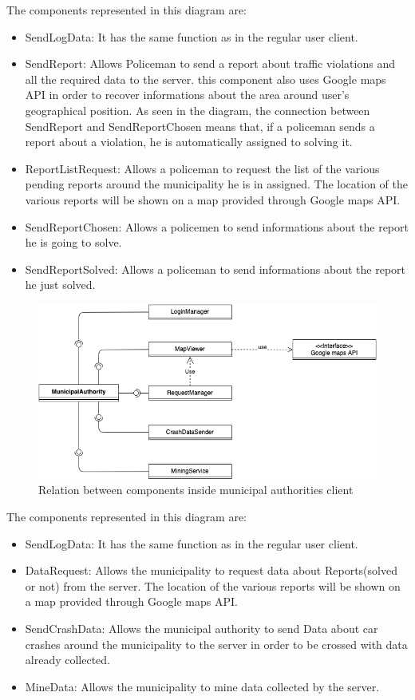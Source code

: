 The components represented in this diagram are:
\begin{itemize}
	\item SendLogData: It has the same function as in the regular user client.
	\item SendReport: Allows Policeman to send a report about traffic violations and all the required data to the server.
	this component also uses Google maps API in order to recover informations about the area around user's geographical position.
	As seen in the diagram, the connection between SendReport and SendReportChosen means that, if a policeman sends a report about a violation, he is automatically assigned to solving it.
	\item ReportListRequest: Allows a policeman to request the list of the various pending reports around the municipality  he is in assigned.
	The location of the various reports will be shown on a map provided through Google maps API.
	\item SendReportChosen: Allows a policemen to send informations about the report he is going to solve.
	\item SendReportSolved: Allows a policeman to send informations about the report he just solved.
\end{itemize}
\newpage
\begin{figure}[H]
	\centering
	\includegraphics[scale=0.7]{Images/MunicipalAuthoritiesClient}
	\caption{Relation between components inside municipal authorities client}
\end{figure}
The components represented in this diagram are:
\begin{itemize}
	\item SendLogData: It has the same function as in the regular user client.
	\item DataRequest: Allows the municipality to request data about Reports(solved or not) from the server.
	The location of the various reports will be shown on a map provided through Google maps API.
	\item SendCrashData: Allows the municipal authority to send Data about car crashes around the municipality to the server in order to be crossed with data already collected.
	\item MineData: Allows the municipality to mine data collected by the server.
\end{itemize}

